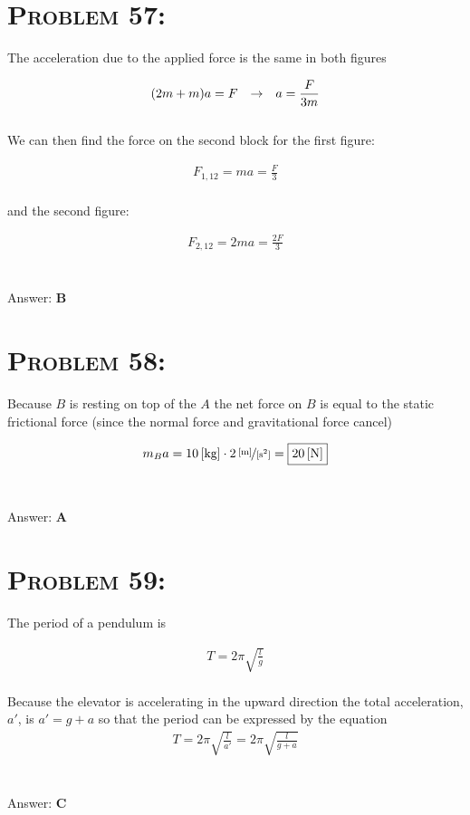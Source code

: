 \documentclass{article}
\begin{document}
\section{\textsc{Problem 57:}} The acceleration due to the applied force is the same in both figures

\begin{align}
(2m +m)a = F \hspace{.1in} \rightarrow \hspace{.1in} a = \frac{F}{3m}\nonumber
\end{align}
\\
We can then find the force on the second block for the first figure:

\begin{align}
F_{1,12} = ma = \boxed{\frac{F}{3}}\nonumber
\end{align}
\\
and the second figure:

\begin{align}
F_{2,12} = 2ma = \boxed{\frac{2F}{3}}\nonumber
\end{align}
\\\\
Answer: \textbf{\textcolor{ProcessBlue}B}\\


\section{\textsc{Problem 58:}} Because $B$ is resting on top of the $A$ the net force on $B$ is equal to the static frictional force (since the normal force and gravitational force cancel)

\begin{align}
m_{B} a = \unit[10]{[kg]} \cdot \unitfrac[2]{[m]}{[s^{2}]} = \boxed{\unit[20]{[N]}}\nonumber
\end{align}
\\\\
Answer: \textbf{\textcolor{ProcessBlue}A}\\


\section{\textsc{Problem 59:}} The period of a pendulum is

\begin{align}
T = 2 \pi \sqrt{\frac{l}{g}}
\end{align}
\\
Because the elevator is accelerating in the upward direction the total acceleration, $a'$, is $a' = g + a$ so that the period can be expressed by the equation
\begin{align}
T = 2 \pi \sqrt{\frac{l}{a'}} = \boxed{2 \pi \sqrt{\frac{l}{g + a}}}\nonumber
\end{align}
\\\\
Answer: \textbf{\textcolor{ProcessBlue}C}\\
\end{document}
